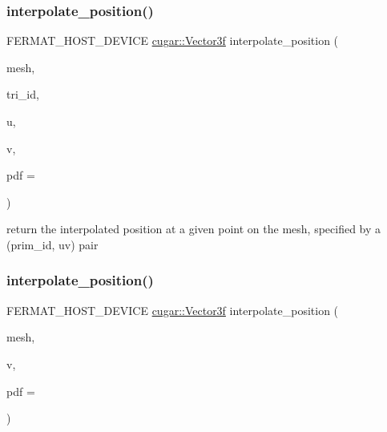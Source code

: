 \subsubsection{\texorpdfstring{interpolate\+\_\+position()}{interpolate\_position()}\hspace{0.1cm}{\footnotesize\ttfamily [1/2]}}
{\footnotesize\ttfamily F\+E\+R\+M\+A\+T\+\_\+\+H\+O\+S\+T\+\_\+\+D\+E\+V\+I\+CE \hyperlink{structcugar_1_1_vector}{cugar\+::\+Vector3f} interpolate\+\_\+position (\begin{DoxyParamCaption}\item[{const \hyperlink{struct_mesh_view}{Mesh\+View} \&}]{mesh,  }\item[{const uint32}]{tri\+\_\+id,  }\item[{const float}]{u,  }\item[{const float}]{v,  }\item[{float $\ast$}]{pdf = {} }\end{DoxyParamCaption})\hspace{0.3cm}{\ttfamily [inline]}}

return the interpolated position at a given point on the mesh, specified by a (prim\+\_\+id, uv) pair \mbox{\label{group___mesh_module_ga84038ff8b109ab0b5cab8d5557b94d8d}} 
\subsubsection{\texorpdfstring{interpolate\+\_\+position()}{interpolate\_position()}\hspace{0.1cm}{\footnotesize\ttfamily [2/2]}}
{\footnotesize\ttfamily F\+E\+R\+M\+A\+T\+\_\+\+H\+O\+S\+T\+\_\+\+D\+E\+V\+I\+CE \hyperlink{structcugar_1_1_vector}{cugar\+::\+Vector3f} interpolate\+\_\+position (\begin{DoxyParamCaption}\item[{const \hyperlink{struct_mesh_view}{Mesh\+View} \&}]{mesh,  }\item[{const \hyperlink{struct_vertex_geometry_id}{Vertex\+Geometry\+Id}}]{v,  }\item[{float $\ast$}]{pdf = {} }\end{DoxyParamCaption})\hspace{0.3cm}{\ttfamily [inline]}}

